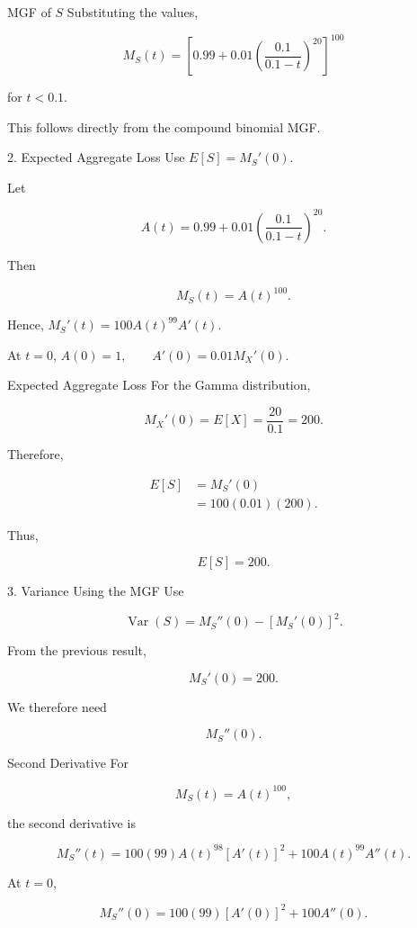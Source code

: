 \documentclass[
  ignorenonframetext,
  aspectratio=169,
]{beamer}
\begin{document}
\begin{frame}{MGF of \(S\)}
\protect{}\label{mgf-of-s}
Substituting the values,

\[
\boxed{
M_S(t)=
\left[
0.99+
0.01\left(\frac{0.1}{0.1-t}\right)^{20}
\right]^{100}
}
\]

for \(t<0.1\).

This follows directly from the compound binomial MGF.
\end{frame}

\begin{frame}{2. Expected Aggregate Loss}
\protect{}\label{expected-aggregate-loss-1}
Use \(E[S]=M_S'(0).\)

Let

\[
A(t)=
0.99+
0.01\left(\frac{0.1}{0.1-t}\right)^{20}.
\]

Then

\[
M_S(t)=A(t)^{100}.
\]

Hence, \(M_S'(t)=100A(t)^{99}A'(t).\)

At \(t=0\), \qquad \(A(0)=1, \qquad A'(0)=0.01M_X'(0).\)
\end{frame}

\begin{frame}{Expected Aggregate Loss}
\protect{}\label{expected-aggregate-loss-2}
For the Gamma distribution,

\[
M_X'(0)=E[X]
=\frac{20}{0.1}=200.
\]

Therefore,

\[
\begin{aligned}
E[S]
&=M_S'(0)\\
&=100(0.01)(200).
\end{aligned}
\]

Thus,

\[
\boxed{E[S]=200}.
\]
\end{frame}

\begin{frame}{3. Variance Using the MGF}
\protect{}\label{variance-using-the-mgf}
Use

\[
\operatorname{Var}(S)
=
M_S''(0)-[M_S'(0)]^2.
\]

From the previous result,

\[
M_S'(0)=200.
\]

We therefore need

\[
M_S''(0).
\]
\end{frame}

\begin{frame}{Second Derivative}
\protect{}\label{second-derivative}
For

\[
M_S(t)=A(t)^{100},
\]

the second derivative is

\[
M_S''(t)
=
100(99)A(t)^{98}[A'(t)]^2
+
100A(t)^{99}A''(t).
\]

At \(t=0\),

\[
M_S''(0)
=
100(99)[A'(0)]^2
+
100A''(0).
\]
\end{frame}
\end{document}
